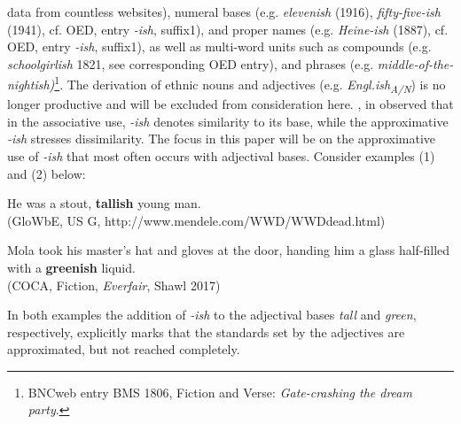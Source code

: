 \documentclass[output=paper
,modfonts
,nonflat]{langsci/langscibook}
\begin{document}
data from countless websites), numeral bases (e.g.  \textit{elevenish} (1916),  \textit{fifty-five-ish} (1941), cf. OED, entry \textit{-ish}, suffix1), and proper names (e.g.  \textit{Heine-ish} (1887), cf. OED, entry \textit{-ish}, suffix1), as well as multi-word units such as compounds (e.g.  \textit{schoolgirlish} 1821, see corresponding OED entry), and phrases (e.g.  \textit{middle-of-the-nightish)}\footnote{BNCweb entry \cite{BNCweb} BMS 1806, Fiction and Verse: \textit{Gate-crashing the dream party}.}. The derivation of ethnic nouns and adjectives (e.g.  \textit{Engl.ish\textsubscript{A/N}}) is no longer productive and will be excluded from consideration here. \textcite{Kuzmack2007}, in \textcite*[234]{Traugott2013} observed that in the associative use,  \textit{-ish} denotes similarity to its base, while the approximative  \textit{-ish} stresses dissimilarity. The focus in this paper will be on the approximative use of  \textit{-ish} that most often occurs with adjectival bases. Consider examples (1) and (2) below:
\begin{examples}
	\item He was a stout, \textbf{tallish} young man. \\ (GloWbE, US G, http://www.mendele.com/WWD/WWDdead.html)
	\item Mola took his master's hat and gloves at the door, handing him a glass half-filled with a \textbf{greenish} liquid. \\ (COCA, Fiction, \textit{Everfair}, Shawl 2017)
\end{examples}

In both examples the addition of \textit{-ish} to the adjectival bases  \textit{tall} and  \textit{green}, respectively, explicitly marks that the standards set by the adjectives are approximated, but not reached completely.
\end{document}
